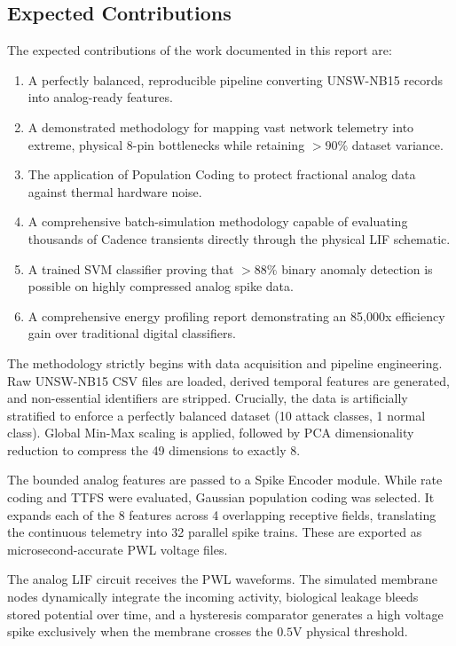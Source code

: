 \documentclass{ieeeaccess}
\begin{document}
\subsection{Expected Contributions}

The expected contributions of the work documented in this report are:
\begin{enumerate}
\item A perfectly balanced, reproducible pipeline converting UNSW-NB15 records into analog-ready features.
\item A demonstrated methodology for mapping vast network telemetry into extreme, physical 8-pin bottlenecks while retaining $>90\%$ dataset variance.
\item The application of Population Coding to protect fractional analog data against thermal hardware noise.
\item A comprehensive batch-simulation methodology capable of evaluating thousands of Cadence transients directly through the physical LIF schematic.
\item A trained SVM classifier proving that $>88\%$ binary anomaly detection is possible on highly compressed analog spike data.
\item A comprehensive energy profiling report demonstrating an 85,000x efficiency gain over traditional digital classifiers.
\end{enumerate}



 



The methodology strictly begins with data acquisition and pipeline engineering. Raw UNSW-NB15 CSV files are loaded, derived temporal features are generated, and non-essential identifiers are stripped. Crucially, the data is artificially stratified to enforce a perfectly balanced dataset (10 attack classes, 1 normal class). Global Min-Max scaling is applied, followed by PCA dimensionality reduction to compress the 49 dimensions to exactly 8.

The bounded analog features are passed to a Spike Encoder module. While rate coding and TTFS were evaluated, Gaussian population coding was selected. It expands each of the 8 features across 4 overlapping receptive fields, translating the continuous telemetry into 32 parallel spike trains. These are exported as microsecond-accurate PWL voltage files.

The analog LIF circuit receives the PWL waveforms. The simulated membrane nodes dynamically integrate the incoming activity, biological leakage bleeds stored potential over time, and a hysteresis comparator generates a high voltage spike exclusively when the membrane crosses the $0.5\text{V}$ physical threshold.
\end{document}
